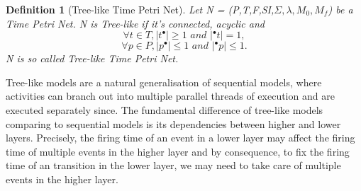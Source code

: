 \documentclass[conference]{IEEEtran}
\newtheorem{definition}{Definition}
\begin{document}
\begin{definition}[Tree-like Time Petri Net]
    Let N = (P,T,F,SI,$\Sigma,\lambda,M_0,M_f$) be a Time Petri Net. N is Tree-like if it's connected, acyclic and \[\forall t \in T, |t^{\bullet}| \geq 1 \textit{ and } |{}^{\bullet}t| = 1,\] \[\forall p \in P, |p^{\bullet}| \leq 1 \textit{ and } |{}^{\bullet}p| \leq 1.\]
    N is so called Tree-like Time Petri Net.
\end{definition}
Tree-like models are a natural generalisation of sequential models, where activities can branch out into multiple parallel threads of execution and are executed separately since.
The fundamental difference of tree-like models comparing to sequential models is its dependencies between 
higher and lower layers. Precisely, the firing time of an event in a lower layer may affect the firing time of multiple events in the higher layer and by consequence, to fix the firing time of an transition in the lower layer, we may need to take care of multiple events in the higher layer.
\end{document}
